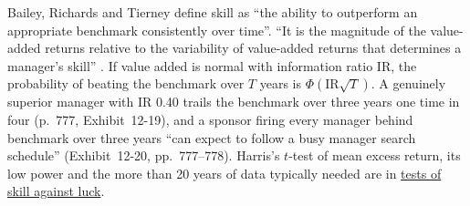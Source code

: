 \begin{qfmethod}\label{meth:manager-skill-evaluation}
 Bailey, Richards and Tierney define skill as ``the ability to outperform an appropriate benchmark consistently over time''. ``It is the magnitude of the value-added returns relative to the variability of value-added returns that determines a manager's skill'' \citep[chap.~12, p.~767]{managing-investment-portfolios-2007}. If value added is normal with information ratio IR, the probability of beating the benchmark over $T$ years is $\Phi(\text{IR}\sqrt T)$. A genuinely superior manager with IR 0.40 trails the benchmark over three years one time in four (p.~777, Exhibit~12-19), and a sponsor firing every manager behind benchmark over three years ``can expect to follow a busy manager search schedule'' (Exhibit~12-20, pp.~777--778). Harris's $t$-test of mean excess return, its low power and the more than 20 years of data typically needed are in \hyperref[meth:skill-luck-significance-tests]{tests of skill against luck}.


\end{qfmethod}
